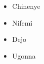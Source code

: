 \documentclass{article}
\begin{document}
	
	\begin{itemize}
		\item Chinenye
		\item Nifemi
		\item Dejo
		\item Ugonna
	\end{itemize}
\end{document}
